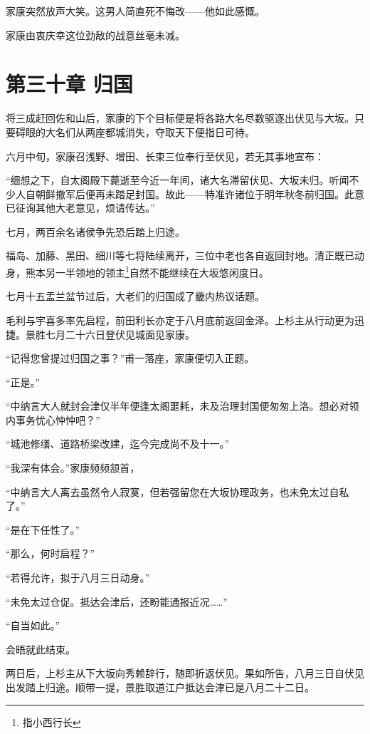 \documentclass[
]{book}
\begin{document}
家康突然放声大笑。这男人简直死不悔改------他如此感慨。

家康由衷庆幸这位劲敌的战意丝毫未减。

\chapter*{第三十章 归国}\label{ux7b2cux4e09ux5341ux7ae0-ux5f52ux56fd}

将三成赶回佐和山后，家康的下个目标便是将各路大名尽数驱逐出伏见与大坂。只要碍眼的大名们从两座都城消失，夺取天下便指日可待。

六月中旬，家康召浅野、增田、长束三位奉行至伏见，若无其事地宣布：

``细想之下，自太阁殿下薨逝至今近一年间，诸大名滞留伏见、大坂未归。听闻不少人自朝鲜撤军后便再未踏足封国。故此------特准许诸位于明年秋冬前归国。此意已征询其他大老意见，烦请传达。''

七月，两百余名诸侯争先恐后踏上归途。

福岛、加藤、黑田、细川等七将陆续离开，三位中老也各自返回封地。清正既已动身，熊本另一半领地的领主\footnote{指小西行长}自然不能继续在大坂悠闲度日。

七月十五盂兰盆节过后，大老们的归国成了畿内热议话题。

毛利与宇喜多率先启程，前田利长亦定于八月底前返回金泽。上杉主从行动更为迅捷。景胜七月二十六日登伏见城面见家康。

``记得您曾提过归国之事？''甫一落座，家康便切入正题。

``正是。''

``中纳言大人就封会津仅半年便逢太阁噩耗，未及治理封国便匆匆上洛。想必对领内事务忧心忡忡吧？''

``城池修缮、道路桥梁改建，迄今完成尚不及十一。''

``我深有体会。''家康频频颔首，

``中纳言大人离去虽然令人寂寞，但若强留您在大坂协理政务，也未免太过自私了。''

``是在下任性了。''

``那么，何时启程？''

``若得允许，拟于八月三日动身。''

``未免太过仓促。抵达会津后，还盼能通报近况\ldots\ldots{}''

``自当如此。''

会晤就此结束。

两日后，上杉主从下大坂向秀赖辞行，随即折返伏见。果如所告，八月三日自伏见出发踏上归途。顺带一提，景胜取道江户抵达会津已是八月二十二日。
\end{document}
